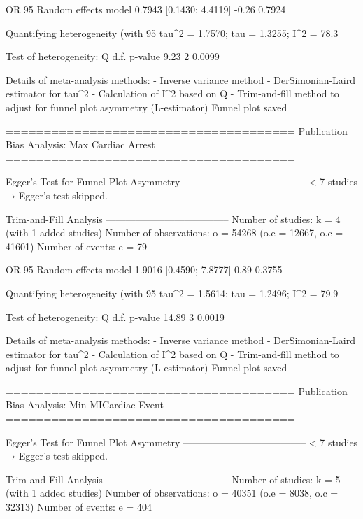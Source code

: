                          OR           95%
Random effects model 0.7943 [0.1430; 4.4119] -0.26  0.7924

Quantifying heterogeneity (with 95%
 tau^2 = 1.7570; tau = 1.3255; I^2 = 78.3%

Test of heterogeneity:
    Q d.f. p-value
 9.23    2  0.0099

Details of meta-analysis methods:
- Inverse variance method
- DerSimonian-Laird estimator for tau^2
- Calculation of I^2 based on Q
- Trim-and-fill method to adjust for funnel plot asymmetry (L-estimator)
  Funnel plot saved

======================================
Publication Bias Analysis: Max Cardiac Arrest 
======================================
                                                                                                                                                        
Egger's Test for Funnel Plot Asymmetry
--------------------------------------
  < 7 studies → Egger’s test skipped.

Trim-and-Fill Analysis
--------------------------------------
Number of studies: k = 4 (with 1 added studies)
Number of observations: o = 54268 (o.e = 12667, o.c = 41601)
Number of events: e = 79

                         OR           95%
Random effects model 1.9016 [0.4590; 7.8777] 0.89  0.3755

Quantifying heterogeneity (with 95%
 tau^2 = 1.5614; tau = 1.2496; I^2 = 79.9%

Test of heterogeneity:
     Q d.f. p-value
 14.89    3  0.0019

Details of meta-analysis methods:
- Inverse variance method
- DerSimonian-Laird estimator for tau^2
- Calculation of I^2 based on Q
- Trim-and-fill method to adjust for funnel plot asymmetry (L-estimator)
  Funnel plot saved

======================================
Publication Bias Analysis: Min MICardiac Event 
======================================
                                                                                                                                                        
Egger's Test for Funnel Plot Asymmetry
--------------------------------------
  < 7 studies → Egger’s test skipped.

Trim-and-Fill Analysis
--------------------------------------
Number of studies: k = 5 (with 1 added studies)
Number of observations: o = 40351 (o.e = 8038, o.c = 32313)
Number of events: e = 404

